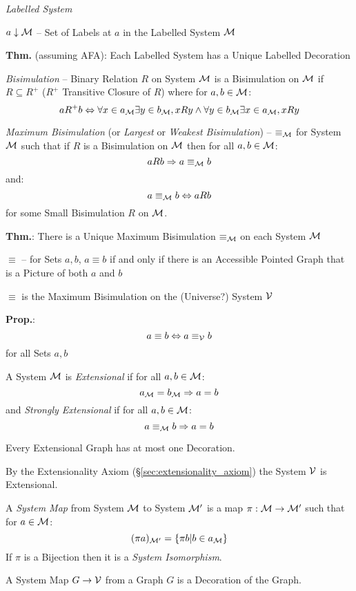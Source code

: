 \emph{Labelled System}

$a \downarrow \mathcal{M}$ -- Set of Labels at $a$ in the Labelled
System $\mathcal{M}$

\textbf{Thm.} (assuming AFA): Each Labelled System has a Unique
Labelled Decoration

\emph{Bisimulation} -- Binary Relation $R$ on System $\mathcal{M}$ is a
Bisimulation on $\mathcal{M}$ if $R \subseteq R^+$ ($R^+$ Transitive
Closure of $R$) where for $a,b \in \mathcal{M}$:
\[
  a R^+ b \Leftrightarrow \forall x \in a_\mathcal{M}
    \exists y \in b_\mathcal{M}, x R y \wedge
    \forall y \in b_\mathcal{M} \exists x \in a_\mathcal{M}, x R y
\]

\emph{Maximum Bisimulation} (or \emph{Largest} or \emph{Weakest
  Bisimulation}) -- $\equiv_\mathcal{M}$ for System $\mathcal{M}$ such
that if $R$ is a Bisimulation on $\mathcal{M}$ then for all $a,b \in
\mathcal{M}$:
\[
  a R b \Rightarrow a \equiv_\mathcal{M} b
\]
and:
\[
  a \equiv_\mathcal{M} b \Leftrightarrow a R b
\]
for some Small Bisimulation $R$ on $\mathcal{M}$.

\textbf{Thm.}: There is a Unique Maximum Bisimulation
$\equiv_\mathcal{M}$ on each System $\mathcal{M}$

$\equiv$ -- for Sets $a,b$, $a \equiv b$ if and only if there is an
Accessible Pointed Graph that is a Picture of both $a$ and $b$

$\equiv$ is the Maximum Bisimulation on the (Universe?) System
$\mathcal{V}$ %

\textbf{Prop.}:
\[
  a \equiv b \Leftrightarrow a \equiv_\mathcal{V} b
\]
for all Sets $a,b$

A System $\mathcal{M}$ is \emph{Extensional} if for all $a,b \in
\mathcal{M}$:
\[
  a_\mathcal{M} = b_\mathcal{M} \Rightarrow a = b
\]
and \emph{Strongly Extensional} if for all $a,b \in \mathcal{M}$:
\[
  a \equiv_\mathcal{M} b \Rightarrow a = b
\]

Every Extensional Graph has at most one Decoration.

By the Extensionality Axiom (\S\ref{sec:extensionality_axiom}) the
System $\mathcal{V}$ is Extensional.

A \emph{System Map} from System $\mathcal{M}$ to System $\mathcal{M}'$ is
a map $\pi : \mathcal{M} \rightarrow \mathcal{M}'$ such that for $a \in
\mathcal{M}$:
\[
  (\pi a)_{\mathcal{M}'} = \{ \pi b | b \in a_\mathcal{M} \}
\]
If $\pi$ is a Bijection then it is a \emph{System Isomorphism}.

A System Map $G \rightarrow \mathcal{V}$ from a Graph $G$ is a
Decoration of the Graph.

